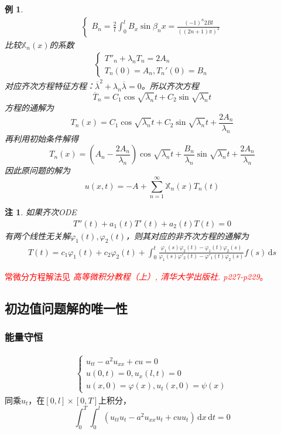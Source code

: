 \documentclass[11pt, a4paper]{article}
\theoremstyle{theorem}
\newtheorem*{note}{注}
\newtheorem{eg}[thm]{例}
\newcommand{\intd}[1]{\,\mathrm{d}{#1}}
\begin{document}
\begin{eg}
\begin{align*}
\begin{cases}
    B_n = \frac{2}{l} \int_0^l B_x \sin \beta_n x = \frac{(-1)^n  2 Bl}{((2n+1)\pi)^2}
    \end{cases}
\end{align*}
比较$\mathbb{X}_n(x)$的系数
\begin{align*}
    \begin{cases}
    T''_n + \lambda_n T_n = 2 A_n \\
    T_n(0) = A_n, T_n'(0) = B_n
    \end{cases}
\end{align*}
对应齐次方程特征方程：$\overline{\lambda}^2 + \lambda_n \overline{\lambda} = 0$。所以齐次方程
$$
\overline{T}_n = C_1 \cos \sqrt{\lambda_n}t + C_2 \sin \sqrt{\lambda_n} t
$$
方程的通解为
$$
T_n(x) =  C_1 \cos \sqrt{\lambda_n}t + C_2 \sin \sqrt{\lambda_n} t + \frac{2A_n}{\lambda_n}
$$
再利用初始条件解得
$$
T_n(x) =  (A_n - \frac{2A_n}{\lambda_n}) \cos \sqrt{\lambda_n}t + \frac{B_n}{\lambda_n} \sin \sqrt{\lambda_n} t + \frac{2A_n}{\lambda_n}
$$
因此原问题的解为
$$
u(x,t) = -A + \sum_{n=1}^\infty \mathbb{X}_n(x)T_n(t)
$$
\end{eg}

\begin{note}
如果齐次ODE
\begin{align}
    T''(t) + a_1(t) T'(t) + a_2(t) T(t) = 0
\end{align}
有两个线性无关解$\varphi_1(t), \varphi_2(t)$，则其对应的非齐次方程的通解为
\begin{align}
    T(t) = c_1 \varphi_1(t) + c_2 \varphi_2(t) + \int_0^t \frac{\varphi_1(s)\varphi_2(t) - \varphi_1(t) \varphi_2(s)}{\varphi_1(s)\varphi'_2(t) - \varphi'_1(t)\varphi_2(s)}f(s) \intd s
\end{align}
\end{note}

\textcolor{red}{常微分方程解法见 \emph{高等微积分教程（上）, 清华大学出版社. p227-p229}。}

\subsection{初边值问题解的唯一性}

\subsubsection{能量守恒}

\begin{align}
\label{Q3-11-1}
    \begin{cases}
    u_{tt} - a^2 u_{xx} + cu = 0 \\
    u(0,t) = 0, u_x(l,t) = 0 \\
    u(x,0) = \varphi(x), u_t(x,0) = \psi(x)
    \end{cases}
\end{align}
同乘$u_t$，在$[0,l] \times [0,T]$上积分，
$$
\int_0^T \int_0^l (u_{tt}u_t - a^2 u_{xx}u_t + cu u_t) \intd x \intd t = 0
$$
\end{document}
